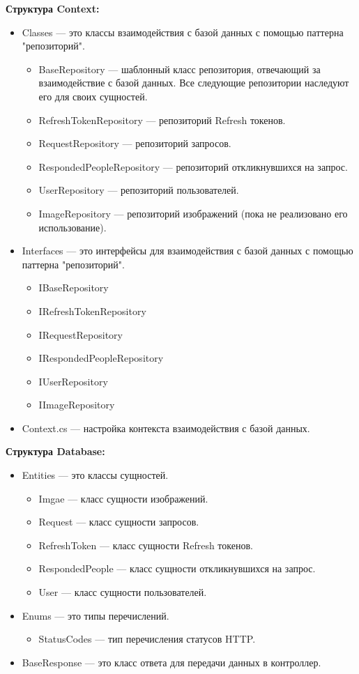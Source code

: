 \textbf{Структура Context:}
\begin{itemize}
	\item{Classes --- это классы взаимодействия с базой данных с помощью паттерна "репозиторий".
			\begin{itemize}
				\item{BaseRepository --- шаблонный класс репозитория, отвечающий за взаимодействие с базой данных. Все следующие репозитории наследуют его для своих сущностей.}
				\item{RefreshTokenRepository --- репозиторий Refresh токенов.}
				\item{RequestRepository --- репозиторий запросов.}
				\item{RespondedPeopleRepository --- репозиторий откликнувшихся на запрос.}
				\item{UserRepository --- репозиторий пользователей.}
				\item{ImageRepository --- репозиторий изображений (пока не реализовано его использование).}
			\end{itemize}
		}
	\item{Interfaces --- это интерфейсы для взаимодействия с базой данных с помощью паттерна "репозиторий".
			\begin{itemize}
				\item{IBaseRepository}
				\item{IRefreshTokenRepository}
				\item{IRequestRepository}
				\item{IRespondedPeopleRepository}
				\item{IUserRepository}
				\item{IImageRepository}
			\end{itemize}
		}
	\item{Context.cs --- настройка контекста взаимодействия с базой данных.}
\end{itemize}

\textbf{Структура Database:}
\begin{itemize}
	\item{Entities --- это классы сущностей.
			\begin{itemize}
				\item{Imgae --- класс сущности изображений.}
				\item{Request --- класс сущности запросов.}
				\item{RefreshToken --- класс сущности Refresh токенов.}
				\item{RespondedPeople --- класс сущности откликнувшихся на запрос.}
				\item{User --- класс сущности пользователей.}
			\end{itemize}
		}
	\item{Enums --- это типы перечислений.
			\begin{itemize}
				\item{StatusCodes --- тип перечисления статусов HTTP.}
			\end{itemize}
		}
	\item{BaseResponse --- это класс ответа для передачи данных в контроллер. }
\end{itemize}

